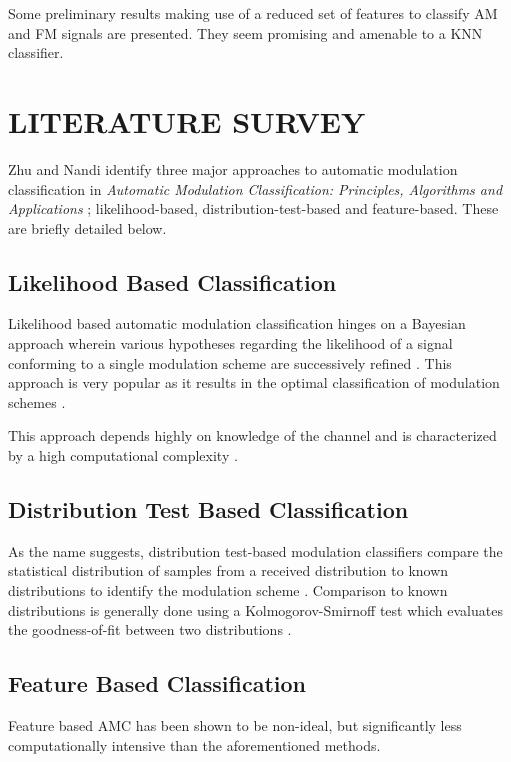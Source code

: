 \documentclass[10pt,twocolumn]{witseiepaper}
\begin{document}
Some preliminary results making use of a reduced set of features to classify AM and FM signals are presented. They seem promising and amenable to a KNN classifier.

\section{LITERATURE SURVEY}
Zhu and Nandi identify three major approaches to automatic modulation classification in \textit{Automatic Modulation Classification: Principles, Algorithms and Applications} \cite{zhu2014automatic}; likelihood-based, distribution-test-based and feature-based. These are briefly detailed below.

	\subsection{Likelihood Based Classification}
	Likelihood based automatic modulation classification hinges on a Bayesian approach wherein various hypotheses regarding the likelihood of a signal conforming to a single modulation scheme are successively refined \cite{zhu2014automatic}. This approach is very popular as it results in the optimal classification of modulation schemes \cite{zhu2014automatic}.

	This approach depends highly on knowledge of the channel and is characterized by a high computational complexity \cite{zhu2014automatic}. 

	\subsection{Distribution Test Based Classification}
	As the name suggests, distribution test-based modulation classifiers compare the statistical distribution of samples from a received distribution to known distributions to identify the modulation scheme \cite{zhu2014automatic}. Comparison to known distributions is generally done using a Kolmogorov-Smirnoff test which evaluates the goodness-of-fit between two distributions \cite{urriza2011computationally}.


	\subsection{Feature Based Classification}
	\label{sec:features}
	Feature based AMC has been shown to be non-ideal, but significantly less computationally intensive \cite{zhu2014automatic} than the aforementioned methods.
\end{document}
